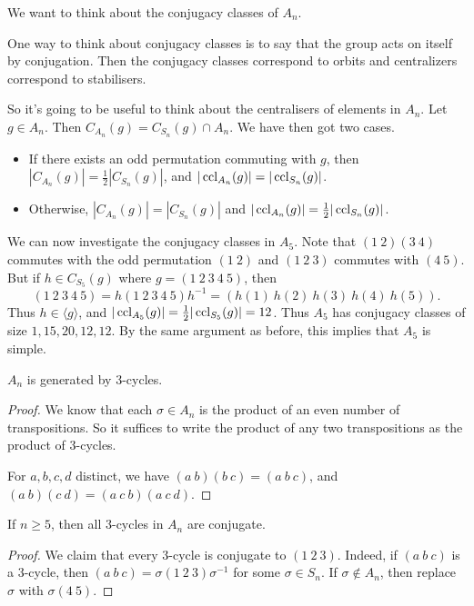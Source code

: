 \documentclass[a4paper]{scrreprt}
\begin{document}
We want to think about the conjugacy classes of $A_n$.


One way to think about conjugacy classes is to say that the group acts on itself by conjugation. Then the conjugacy classes correspond to orbits and centralizers correspond to stabilisers.

So it's going to be useful to think about the centralisers of elements in $A_n$. 
Let $g \in A_n$. Then $C_{A_n}(g) = C_{S_n}(g) \cap A_n$. We have then got two cases.
\begin{itemize}
	\item If there exists an odd permutation commuting with $g$, then $|C_{A_n}(g)| = \frac{1}{2}|C_{S_n}(g)|$, and $|\operatorname{ccl}_{A_n}(g)| = |\operatorname{ccl}_{S_n}(g)|$.
	\item  Otherwise, $|C_{A_n}(g)| = |C_{S_n}(g)|$ and $|\operatorname{ccl}_{A_n}(g)| = \frac{1}{2}|\operatorname{ccl}_{S_n}(g)|$.
\end{itemize}

\begin{example}
	We can now investigate the conjugacy classes in $A_5$. Note that $(1\ 2)(3\ 4)$ commutes with the odd permutation $(1\ 2)$ and $(1\ 2\ 3)$ commutes with $(4\ 5)$. But if $h \in C_{S_5}(g)$ where $g = (1\ 2\ 3\ 4\ 5)$, then
	$$
(1\ 2\ 3\ 4\ 5) = h (1\ 2\ 3\ 4\ 5) h^{-1} = (h(1)\ h(2)\ h(3)\ h(4)\ h(5)).
	$$
	Thus $h \in \langle g \rangle$, and $|\operatorname{ccl}_{A_5}(g)| = \frac{1}{2}|\operatorname{ccl}_{S_5}(g)| = 12$. Thus $A_5$ has conjugacy classes of size $1, 15, 20, 12, 12$. By the same argument as before, this implies that $A_5$ is simple.
\end{example}

\begin{lemma}[Generators of $A_n$]
	$A_n$ is generated by 3-cycles.
\end{lemma}
\begin{proof}
	We know that each $\sigma \in A_n$ is the product of an even number of transpositions. So it suffices to write the product of any two transpositions as the product of 3-cycles. 

	For $a, b, c, d$ distinct, we have $(a\ b)(b\ c) = (a\ b\ c)$, and $(a\ b)(c\ d) = (a\ c\ b)(a\ c\ d)$.
\end{proof}

\begin{lemma}
	If $n \geq 5$, then all $3$-cycles in $A_n$ are conjugate.
\end{lemma}
\begin{proof}
	We claim that every 3-cycle is conjugate to $(1\ 2\ 3)$. Indeed, if $(a\ b\ c)$ is a 3-cycle, then $(a\ b\ c)=\sigma (1\ 2\ 3)\sigma^{-1}$ for some $\sigma \in S_n$. If $\sigma \not \in A_n$, then replace $\sigma$ with $\sigma (4\ 5)$.
\end{proof}
\end{document}
